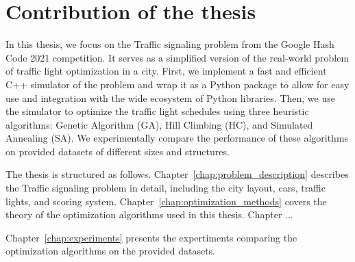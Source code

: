 \section*{Contribution of the thesis}


In this thesis, we focus on the Traffic signaling problem from the Google Hash Code 2021 competition. It serves as a simplified version of the real-world problem of traffic light optimization in a city. First, we implement a fast and efficient C++ simulator of the problem and wrap it as a Python package to allow for easy use and integration with the wide ecosystem of Python libraries. Then, we use the simulator to optimize the traffic light schedules using three heuristic algorithms: Genetic Algorithm (GA), Hill Climbing (HC), and Simulated Annealing (SA). We experimentally compare the performance of these algorithms on provided datasets of different sizes and structures.

The thesis is structured as follows. Chapter~\ref{chap:problem_description} describes the Traffic signaling problem in detail, including the city layout, cars, traffic lights, and scoring system. Chapter~\ref{chap:optimization_methods} covers the theory of the optimization algorithms used in this thesis. Chapter ...

Chapter~\ref{chap:experiments} presents the expertiments comparing the optimization algorithms on the provided datasets.

